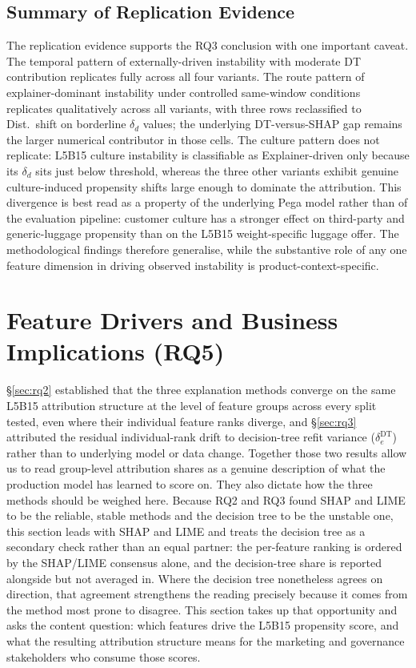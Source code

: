 \documentclass[oneside]{memoir} %
\begin{document}
\subsection{Summary of Replication Evidence}

The replication evidence supports the RQ3 conclusion with one important caveat. The temporal pattern of externally-driven instability with moderate DT contribution replicates fully across all four variants. The route pattern of explainer-dominant instability under controlled same-window conditions replicates qualitatively across all variants, with three rows reclassified to Dist.\ shift on borderline $\delta_d$ values; the underlying DT-versus-SHAP gap remains the larger numerical contributor in those cells. The culture pattern does not replicate: L5B15 culture instability is classifiable as Explainer-driven only because its $\delta_d$ sits just below threshold, whereas the three other variants exhibit genuine culture-induced propensity shifts large enough to dominate the attribution. This divergence is best read as a property of the underlying Pega model rather than of the evaluation pipeline: customer culture has a stronger effect on third-party and generic-luggage propensity than on the L5B15 weight-specific luggage offer. The methodological findings therefore generalise, while the substantive role of any one feature dimension in driving observed instability is product-context-specific.


\section{Feature Drivers and Business Implications (RQ5)} \label{sec:rq5}

§\ref{sec:rq2} established that the three explanation methods converge on the same L5B15 attribution structure at the level of feature groups across every split tested, even where their individual feature ranks diverge, and §\ref{sec:rq3} attributed the residual individual-rank drift to decision-tree refit variance ($\delta_e^{\mathrm{DT}}$) rather than to underlying model or data change. Together those two results allow us to read group-level attribution shares as a genuine description of what the production model has learned to score on. They also dictate how the three methods should be weighed here. Because RQ2 and RQ3 found SHAP and LIME to be the reliable, stable methods and the decision tree to be the unstable one, this section leads with SHAP and LIME and treats the decision tree as a secondary check rather than an equal partner: the per-feature ranking is ordered by the SHAP/LIME consensus alone, and the decision-tree share is reported alongside but not averaged in. Where the decision tree nonetheless agrees on direction, that agreement strengthens the reading precisely because it comes from the method most prone to disagree. This section takes up that opportunity and asks the content question: which features drive the L5B15 propensity score, and what the resulting attribution structure means for the marketing and governance stakeholders who consume those scores.
\end{document}

